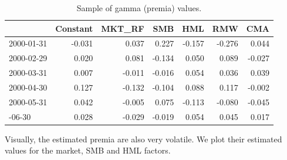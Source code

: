 \documentclass[]{krantz}
\makeatletter
\newenvironment{Shaded}{\begin{snugshade}}{\end{snugshade}}
\newcommand{\CommentTok}[1]{\textcolor[rgb]{0.37,0.37,0.37}{\textit{#1}}}
\newcommand{\DataTypeTok}[1]{\textcolor[rgb]{0.27,0.27,0.27}{#1}}
\newcommand{\DecValTok}[1]{\textcolor[rgb]{0.06,0.06,0.06}{#1}}
\newcommand{\KeywordTok}[1]{\textcolor[rgb]{0.27,0.27,0.27}{\textbf{#1}}}
\newcommand{\NormalTok}[1]{#1}
\newcommand{\OperatorTok}[1]{\textcolor[rgb]{0.43,0.43,0.43}{\textbf{#1}}}
\newcommand{\StringTok}[1]{\textcolor[rgb]{0.5,0.5,0.5}{#1}}
\newenvironment{kframe}{%
\medskip{}
\setlength{\fboxsep}{.8em}
 \def\at@end@of@kframe{}%
 \ifinner\ifhmode%
  \def\at@end@of@kframe{\end{minipage}}%
  \begin{minipage}{\columnwidth}%
 \fi\fi%
 \def\FrameCommand##1{\hskip\@totalleftmargin \hskip-\fboxsep
 \colorbox{shadecolor}{##1}\hskip-\fboxsep
     \hskip-\linewidth \hskip-\@totalleftmargin \hskip\columnwidth}%
 \MakeFramed {\advance\hsize-\width
   \@totalleftmargin\z@ \linewidth\hsize
   \@setminipage}}%
 {\par\unskip\endMakeFramed%
 \at@end@of@kframe}
\renewenvironment{Shaded}{\begin{kframe}}{\end{kframe}}
\theoremstyle{definition}
\theoremstyle{definition}
\theoremstyle{definition}
\theoremstyle{remark}
\makeatother
\begin{document}
\begin{table}[t]

\caption{\label{tab:FamaMacBeth2b}Sample of gamma (premia) values.}
\centering
\begin{tabular}{lrrrrrr}
\toprule
  & Constant & MKT\_RF & SMB & HML & RMW & CMA\\
\midrule
2000-01-31 & -0.031 & 0.037 & 0.227 & -0.157 & -0.276 & 0.044\\
2000-02-29 & 0.020 & 0.081 & -0.134 & 0.050 & 0.089 & -0.027\\
2000-03-31 & 0.007 & -0.011 & -0.016 & 0.054 & 0.036 & 0.039\\
2000-04-30 & 0.127 & -0.132 & -0.104 & 0.088 & 0.117 & -0.002\\
2000-05-31 & 0.042 & -0.005 & 0.075 & -0.113 & -0.080 & -0.045\\
\addlinespace
2000-06-30 & 0.028 & -0.029 & -0.019 & 0.054 & 0.045 & 0.017\\
\bottomrule
\end{tabular}
\end{table}

\normalsize

Visually, the estimated premia are also very volatile. We plot their
estimated values for the market, SMB and HML factors. \footnotesize

\begin{Shaded}
\end{Shaded}
\end{document}
